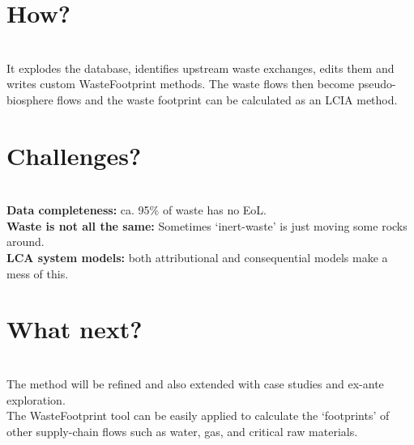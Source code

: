 \documentclass[a0paper,fleqn]{betterposter}
\begin{document}
{    \section{\hspace{2cm}How?}\\
It explodes the database, identifies upstream waste exchanges, edits them and writes custom WasteFootprint methods. The waste flows then become pseudo-biosphere flows and the waste footprint can be calculated as an LCIA method.

    \section{\hspace{2cm}Challenges?}\\
\textbf{Data completeness:} ca. 95\% of waste has no EoL.\\
\textbf{Waste is not all the same:} Sometimes `inert-waste' is just moving some rocks around.\\
 \textbf{LCA system models:} both attributional and consequential models make a mess of this.

    \section{\hspace{2cm}What next?}\\
        The method will be refined and also extended with case studies and ex-ante exploration.\\
        The WasteFootprint tool can be easily applied to calculate the `footprints' of other supply-chain flows
        such as water, gas, and critical raw materials.

}
\end{document}
